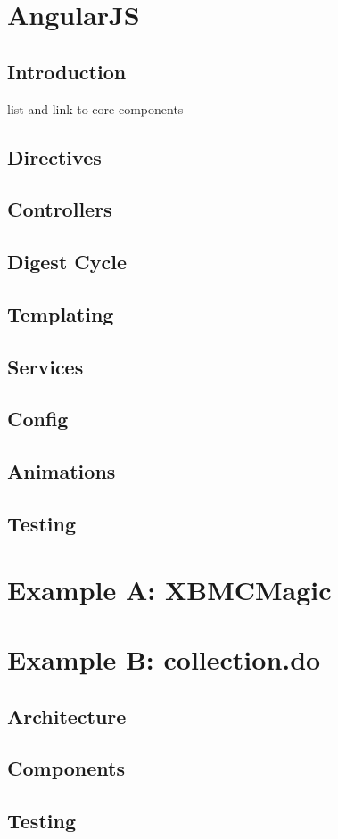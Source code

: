 

\chapter{AngularJS}
\section{Introduction}

list and link to core components

\section{Directives}
\section{Controllers}
\section{Digest Cycle}
\section{Templating}
\section{Services}
\section{Config}
\section{Animations}
\section{Testing}

\chapter{Example A: XBMCMagic}
\label{ch:xbmc}






\chapter{Example B: collection.do}
\label{ch:collection}


\section{Architecture}
\section{Components}
\section{Testing}